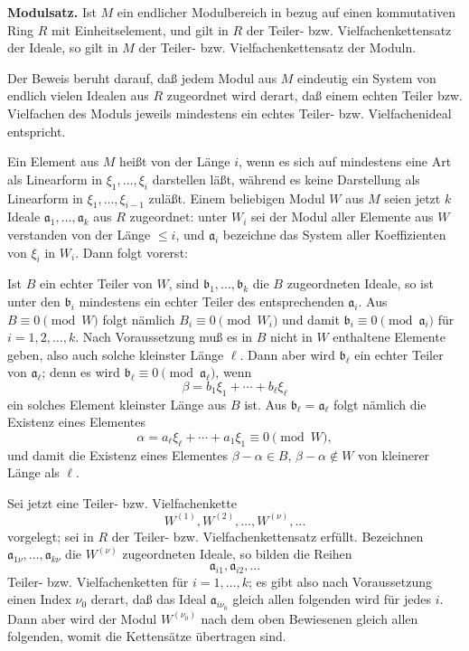 \documentclass[11pt]{article}
\begin{document}
\medskip
\noindent\textbf{Modulsatz.} Ist $M$ ein endlicher Modulbereich in bezug auf
einen kommutativen Ring $R$ mit Einheitselement, und gilt in $R$ der Teiler- bzw.
Vielfachenkettensatz der Ideale, so gilt in $M$ der Teiler- bzw.
Vielfachenkettensatz der Moduln.

Der Beweis beruht darauf, daß jedem Modul aus $M$ eindeutig ein System von
endlich vielen Idealen aus $R$ zugeordnet wird derart, daß einem echten Teiler
bzw. Vielfachen des Moduls jeweils mindestens ein echtes Teiler- bzw.
Vielfachenideal entspricht.

Ein Element aus $M$ heißt von der Länge $i$, wenn es sich auf mindestens eine
Art als Linearform in $\xi_1,\ldots,\xi_i$ darstellen läßt, während es keine
Darstellung als Linearform in $\xi_1,\ldots,\xi_{i-1}$ zuläßt. Einem beliebigen
Modul $W$ aus $M$ seien jetzt $k$ Ideale $\mathfrak a_1,\ldots,\mathfrak a_k$
aus $R$ zugeordnet: unter $W_i$ sei der Modul aller Elemente aus $W$ verstanden
von der Länge $\le i$, und $\mathfrak a_i$ bezeichne das System aller Koeffizienten
von $\xi_i$ in $W_i$. Dann folgt vorerst:

Ist $B$ ein echter Teiler von $W$, sind $\mathfrak b_1,\ldots,\mathfrak b_k$ die
$B$ zugeordneten Ideale, so ist unter den $\mathfrak b_i$ mindestens ein echter
Teiler des entsprechenden $\mathfrak a_i$. Aus $B\equiv0\pmod W$ folgt nämlich
$B_i\equiv0\pmod {W_i}$ und damit $\mathfrak b_i\equiv0\pmod{\mathfrak a_i}$ für
$i=1,2,\ldots,k$. Nach Voraussetzung muß es in $B$ nicht in $W$ enthaltene
Elemente geben, also auch solche kleinster Länge $\ell$. Dann aber wird
$\mathfrak b_\ell$ ein echter Teiler von $\mathfrak a_\ell$; denn es wird
$\mathfrak b_\ell\equiv0\pmod{\mathfrak a_\ell}$, wenn
\[
        \beta=b_1\xi_1+\cdots+b_\ell\xi_\ell
\]
ein solches Element kleinster Länge aus $B$ ist. Aus
$\mathfrak b_\ell=\mathfrak a_\ell$ folgt nämlich die Existenz eines Elementes
\[
        \alpha=a_\ell\xi_\ell+\cdots+a_1\xi_1\equiv0\pmod W,
\]
und damit die Existenz eines Elementes $\beta-\alpha\in B$, $\beta-\alpha\notin W$
von kleinerer Länge als $\ell$.

Sei jetzt eine Teiler- bzw. Vielfachenkette
\[
        W^{(1)},W^{(2)},\ldots,W^{(\nu)},\ldots
\]
vorgelegt; sei in $R$ der Teiler- bzw. Vielfachenkettensatz erfüllt. Bezeichnen
$\mathfrak a_{1\nu},\ldots,\mathfrak a_{k\nu}$ die $W^{(\nu)}$ zugeordneten
Ideale, so bilden die Reihen
\[
        \mathfrak a_{i1},\mathfrak a_{i2},\ldots
\]
Teiler- bzw. Vielfachenketten für $i=1,\ldots,k$; es gibt also nach Voraussetzung
einen Index $\nu_0$ derart, daß das Ideal $\mathfrak a_{i\nu_0}$ gleich allen
folgenden wird für jedes $i$. Dann aber wird der Modul $W^{(\nu_0)}$ nach dem
oben Bewiesenen gleich allen folgenden, womit die Kettensätze übertragen sind.
\end{document}
